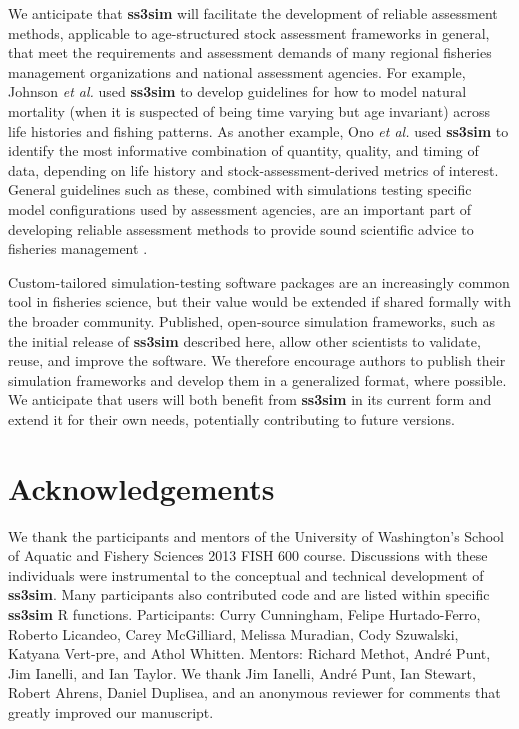 We anticipate that \textbf{ss3sim} will facilitate the development of reliable
assessment methods, applicable to age-structured stock assessment frameworks in
general, that meet the requirements and assessment demands of many regional
fisheries management organizations and national assessment agencies. For
example, Johnson \emph{et al.} \cite{johnson2014} used \textbf{ss3sim} to
develop guidelines for how to model natural mortality (when it is suspected of
being time varying but age invariant) across life histories and fishing
patterns. As another example, Ono \emph{et al.} \cite{ono2014} used
\textbf{ss3sim} to identify the most informative combination of quantity,
quality, and timing of data, depending on life history and
stock-assessment-derived metrics of interest. General guidelines such as these,
combined with simulations testing specific model configurations used by
assessment agencies, are an important part of developing reliable assessment
methods to provide sound scientific advice to fisheries management
\cite{deroba2014, crone2013}.

Custom-tailored simulation-testing software packages are an increasingly common
tool in fisheries science, but their value would be extended if shared formally
with the broader community. Published, open-source simulation frameworks, such
as the initial release of \textbf{ss3sim} described here, allow other
scientists to validate, reuse, and improve the software. We therefore encourage
authors to publish their simulation frameworks and develop them in a
generalized format, where possible. We anticipate that users will both benefit
from \textbf{ss3sim} in its current form and extend it for their own needs,
potentially contributing to future versions.

\section*{Acknowledgements}

We thank the participants and mentors of the University of Washington's School
of Aquatic and Fishery Sciences 2013 FISH 600 course. Discussions with these
individuals were instrumental to the conceptual and technical development of
\textbf{ss3sim}. Many participants also contributed code and are listed within
specific \textbf{ss3sim} \textsf{R} functions. Participants: Curry Cunningham,
Felipe Hurtado-Ferro, Roberto Licandeo, Carey McGilliard, Melissa Muradian,
Cody Szuwalski, Katyana Vert-pre, and Athol Whitten. Mentors: Richard Methot,
Andr\'{e} Punt, Jim Ianelli, and Ian Taylor. We thank Jim Ianelli, Andr\'{e}
Punt, Ian Stewart, Robert Ahrens, Daniel Duplisea, and an anonymous reviewer
for comments that greatly improved our manuscript.

